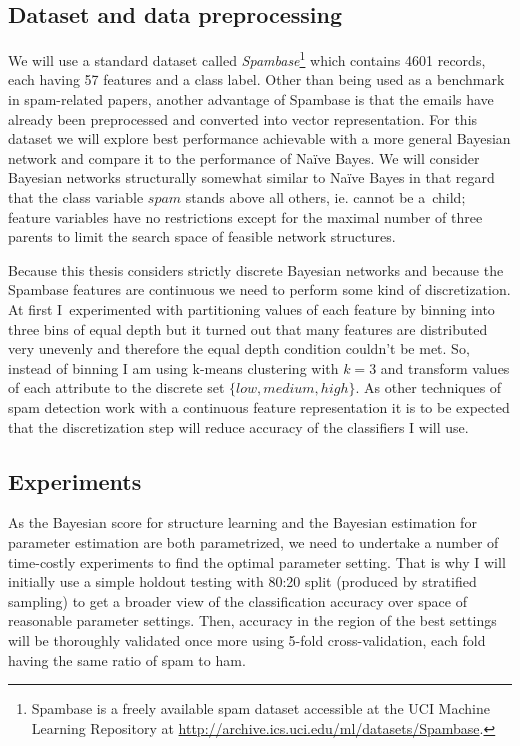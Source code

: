 \documentclass[english,cover]{fitthesis} %
\newcommand{\term}[1]{\emph{#1}}           %
\begin{document}
\subsection{Dataset and data preprocessing}
We will use a standard dataset called \term{Spambase}\footnote{Spambase is a freely available spam dataset accessible at the UCI Machine Learning Repository at \url{http://archive.ics.uci.edu/ml/datasets/Spambase}.} which contains 4601 records, each having 57 features and a class label. Other than being used as a benchmark in spam-related papers, another advantage of Spambase is that the emails have already been preprocessed and converted into vector representation. For this dataset we will explore best performance achievable with a more general Bayesian network and compare it to the performance of Naïve Bayes. We will consider Bayesian networks structurally somewhat similar to Naïve Bayes in that regard that the class variable $spam$ stands above all others, ie. cannot be a~child; feature variables have no restrictions except for the maximal number of three parents to limit the search space of feasible network structures.

Because this thesis considers strictly discrete Bayesian networks and because the Spambase features are continuous we need to perform some kind of discretization. At first I~experimented with partitioning values of each feature by binning into three bins of equal depth but it turned out that many features are distributed very unevenly and therefore the equal depth condition couldn't be met. So, instead of binning I am using k-means clustering with $k=3$ and transform values of each attribute to the discrete set $\lbrace low, medium, high \rbrace$. As other techniques of spam detection work with a continuous feature representation it is to be expected that the discretization step will reduce accuracy of the classifiers I will use.


\subsection{Experiments}
As the Bayesian score for structure learning and the Bayesian estimation for parameter estimation are both parametrized, we need to undertake a number of time-costly experiments to find the optimal parameter setting. That is why I will initially use a simple holdout testing with 80:20 split (produced by stratified sampling) to get a broader view of the classification accuracy over space of reasonable parameter settings. Then, accuracy in the region of the best settings will be thoroughly validated once more using 5-fold cross-validation, each fold having the same ratio of spam to ham.
\end{document}
